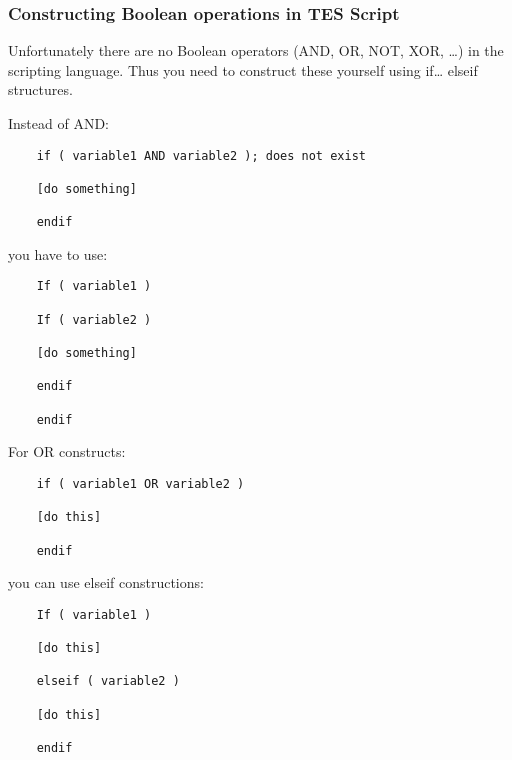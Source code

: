 \hypertarget{constructing-boolean-operations-in-tes-script}{%
\subsubsection{Constructing Boolean operations in TES
Script}\label{constructing-boolean-operations-in-tes-script}}

Unfortunately there are no Boolean operators (AND, OR, NOT, XOR, \ldots)
in the scripting language. Thus you need to construct these yourself
using if\ldots{} elseif structures.

Instead of AND:

\begin{lstlisting}
	if ( variable1 AND variable2 ); does not exist
	
	[do something]
	
	endif
\end{lstlisting}
	
you have to use:

\begin{lstlisting}	
	If ( variable1 )
	
	If ( variable2 )
	
	[do something]
	
	endif
	
	endif
\end{lstlisting}
	
For OR constructs:

\begin{lstlisting}	
	if ( variable1 OR variable2 )
	
	[do this]
	
	endif
\end{lstlisting}
	
you can use elseif constructions:

\begin{lstlisting}	
	If ( variable1 )
	
	[do this]
	
	elseif ( variable2 )
	
	[do this]
	
	endif
\end{lstlisting}